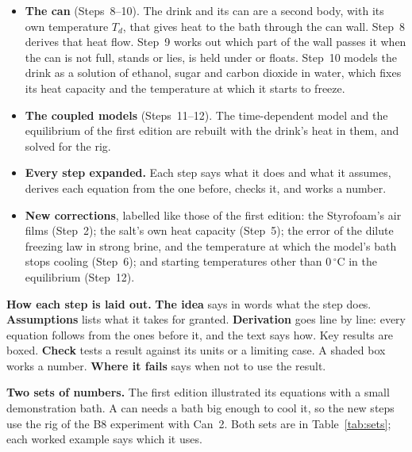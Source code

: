 \documentclass[11pt,a4paper]{article}
\newcommand{\dC}{\,{}^{\circ}\mathrm{C}}
\begin{document}
\begin{itemize}
\item \textbf{The can} (Steps~8--10). The drink and its can are a second body, with its own temperature
  $T_d$, that gives heat to the bath through the can wall. Step~8 derives that heat flow. Step~9 works out
  which part of the wall passes it when the can is not full, stands or lies, is held under or floats.
  Step~10 models the drink as a solution of ethanol, sugar and carbon dioxide in water, which fixes its
  heat capacity and the temperature at which it starts to freeze.
\item \textbf{The coupled models} (Steps~11--12). The time-dependent model and the equilibrium of the first
  edition are rebuilt with the drink's heat in them, and solved for the rig.
\item \textbf{Every step expanded.} Each step says what it does and what it assumes, derives each equation
  from the one before, checks it, and works a number.
\item \textbf{New corrections}, labelled like those of the first edition: the Styrofoam's air films
  (Step~2); the salt's own heat capacity (Step~5); the error of the dilute freezing law in strong brine,
  and the temperature at which the model's bath stops cooling (Step~6); and starting temperatures other
  than $0\dC$ in the equilibrium (Step~12).
\end{itemize}

\textbf{How each step is laid out.} \textbf{The idea} says in words what the step does. \textbf{Assumptions}
lists what it takes for granted. \textbf{Derivation} goes line by line: every equation follows from the ones
before it, and the text says how. Key results are boxed. \textbf{Check} tests a result against its units or
a limiting case. A shaded box works a number. \textbf{Where it fails} says when not to use the result.

\textbf{Two sets of numbers.} The first edition illustrated its equations with a small demonstration
bath. A can needs a bath big enough to cool it, so the new steps use the rig of the B8 experiment with
Can~2. Both sets are in Table~\ref{tab:sets}; each worked example says which it uses.
\end{document}
